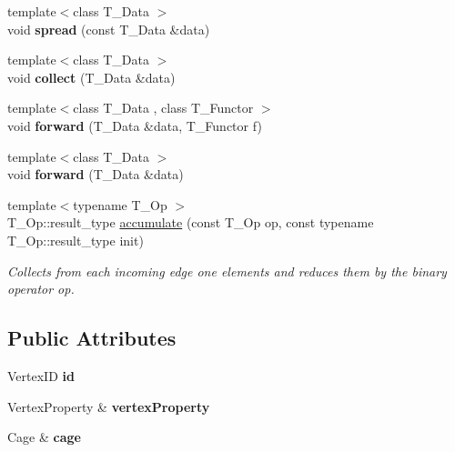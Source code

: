 \begin{DoxyCompactItemize}
\item 
\hypertarget{structCommunicationVertex_ac9944c24156cd67c4757795e9dfcf78a}{}{\footnotesize template$<$class T\+\_\+\+Data $>$ }\\void {\bfseries spread} (const T\+\_\+\+Data \&data)\label{structCommunicationVertex_ac9944c24156cd67c4757795e9dfcf78a}

\item 
\hypertarget{structCommunicationVertex_aff540a3fd0c2ec72cf95cde4ade98804}{}{\footnotesize template$<$class T\+\_\+\+Data $>$ }\\void {\bfseries collect} (T\+\_\+\+Data \&data)\label{structCommunicationVertex_aff540a3fd0c2ec72cf95cde4ade98804}

\item 
\hypertarget{structCommunicationVertex_a4147baf269f625a9437eb09efb419cee}{}{\footnotesize template$<$class T\+\_\+\+Data , class T\+\_\+\+Functor $>$ }\\void {\bfseries forward} (T\+\_\+\+Data \&data, T\+\_\+\+Functor f)\label{structCommunicationVertex_a4147baf269f625a9437eb09efb419cee}

\item 
\hypertarget{structCommunicationVertex_a4899685bdf33f8d7e752100deda85a51}{}{\footnotesize template$<$class T\+\_\+\+Data $>$ }\\void {\bfseries forward} (T\+\_\+\+Data \&data)\label{structCommunicationVertex_a4899685bdf33f8d7e752100deda85a51}

\item 
{\footnotesize template$<$typename T\+\_\+\+Op $>$ }\\T\+\_\+\+Op\+::result\+\_\+type \hyperlink{structCommunicationVertex_aa3b0c6f5b4cc0a284e74fb8c10da43ae}{accumulate} (const T\+\_\+\+Op op, const typename T\+\_\+\+Op\+::result\+\_\+type init)
\begin{DoxyCompactList}\small\item\em Collects from each incoming edge one elements and reduces them by the binary operator op. \end{DoxyCompactList}\end{DoxyCompactItemize}
\subsection*{Public Attributes}
\begin{DoxyCompactItemize}
\item 
\hypertarget{structCommunicationVertex_a468b0059b1c20ea2da85baf06ba09637}{}Vertex\+I\+D {\bfseries id}\label{structCommunicationVertex_a468b0059b1c20ea2da85baf06ba09637}

\item 
\hypertarget{structCommunicationVertex_a8669eae91885d6e15f75a21833e296c6}{}Vertex\+Property \& {\bfseries vertex\+Property}\label{structCommunicationVertex_a8669eae91885d6e15f75a21833e296c6}

\item 
\hypertarget{structCommunicationVertex_a5dfc0cecf345aa1cf5e25b33a708a572}{}Cage \& {\bfseries cage}\label{structCommunicationVertex_a5dfc0cecf345aa1cf5e25b33a708a572}

\end{DoxyCompactItemize}


